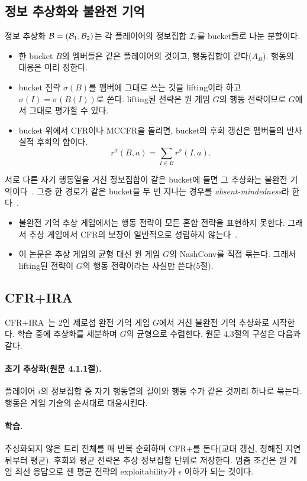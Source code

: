 \subsection{정보 추상화와 불완전 기억}\label{sec:bg-abstraction}
정보 추상화 $\mathcal{B}=(\mathcal{B}_1,\mathcal{B}_2)$는 각 플레이어의 정보집합 $\mathcal{I}_i$를 bucket들로 나눈 분할이다.
\begin{itemize}
  \item 한 bucket $B$의 멤버들은 같은 플레이어의 것이고, 행동집합이 같다($A_B$). 행동의 대응은 미리 정한다.
  \item bucket 전략 $\sigma(B)$를 멤버에 그대로 쓰는 것을 lifting이라 하고 $\sigma(I)=\sigma(B(I))$로 쓴다. lifting된 전략은 원 게임 $G$의 행동 전략이므로 $G$에서 그대로 평가할 수 있다.
  \item bucket 위에서 CFR이나 MCCFR을 돌리면, bucket의 후회 갱신은 멤버들의 반사실적 후회의 합이다.
    \[
    r^\sigma(B,a)=\sum_{I\in B}r^\sigma(I,a).
    \]
\end{itemize}
서로 다른 자기 행동열을 거친 정보집합이 같은 bucket에 들면 그 추상화는 불완전 기억이다~\citep{waugh2009practical,lanctot2012no}.
그중 한 경로가 같은 bucket을 두 번 지나는 경우를 \emph{absent-mindedness}라 한다~\citep{piccione1997interpretation}.
\begin{itemize}
  \item 불완전 기억 추상 게임에서는 행동 전략이 모든 혼합 전략을 표현하지 못한다. 그래서 추상 게임에서 CFR의 보장이 일반적으로 성립하지 않는다~\citep{lanctot2012no}.
  \item 이 논문은 추상 게임의 균형 대신 원 게임 $G$의 NashConv를 직접 묶는다. 그래서 lifting된 전략이 $G$의 행동 전략이라는 사실만 쓴다(5절).
\end{itemize}

\subsection{CFR+IRA}\label{sec:bg-ira}
CFR+IRA~\citep{cermak2020automated}는 2인 제로섬 완전 기억 게임 $G$에서 거친 불완전 기억 추상화로 시작한다. 학습 중에 추상화를 세분하며 $G$의 균형으로 수렴한다.
원문 4.3절의 구성은 다음과 같다.

\paragraph{초기 추상화(원문 4.1.1절).}
플레이어 $i$의 정보집합 중 자기 행동열의 길이와 행동 수가 같은 것끼리 하나로 묶는다. 행동은 게임 기술의 순서대로 대응시킨다.

\paragraph{학습.}
추상화되지 않은 트리 전체를 매 반복 순회하며 CFR+를 돈다(교대 갱신, 정해진 지연 뒤부터 평균). 후회와 평균 전략은 추상 정보집합 단위로 저장한다.
멈춤 조건은 원 게임 최선 응답으로 잰 평균 전략의 exploitability가 $\epsilon$ 이하가 되는 것이다.

